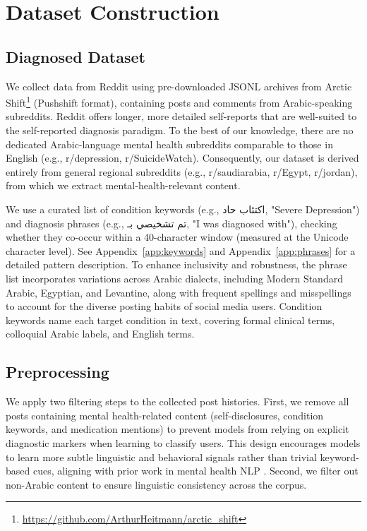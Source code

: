 \documentclass[11pt]{article}
\begin{document}
\section{Dataset Construction}
\label{subsec:data_source}

\subsection{Diagnosed Dataset}

We collect data from Reddit using pre-downloaded JSONL archives from Arctic Shift\footnote{\url{https://github.com/ArthurHeitmann/arctic_shift}} (Pushshift format), containing posts and comments from Arabic-speaking subreddits. Reddit offers longer, more detailed self-reports that are well-suited to the self-reported diagnosis paradigm. To the best of our knowledge, there are no dedicated Arabic-language mental health subreddits comparable to those in English (e.g., r/depression, r/SuicideWatch). Consequently, our dataset is derived entirely from general regional subreddits (e.g., r/saudiarabia, r/Egypt, r/jordan), from which we extract mental-health-relevant content.

We use a curated list of condition keywords (e.g., \foreignlanguage{arabic}{اكتئاب حاد}, "Severe Depression") and diagnosis phrases (e.g., \foreignlanguage{arabic}{تم تشخيصي بـ}, "I was diagnosed with"), checking whether they co-occur within a 40-character window (measured at the Unicode character level). See Appendix~\ref{app:keywords} and Appendix~\ref{app:phrases} for a detailed pattern description. To enhance inclusivity and robustness, the phrase list incorporates variations across Arabic dialects, including Modern Standard Arabic, Egyptian, and Levantine, along with frequent spellings and misspellings to account for the diverse posting habits of social media users. Condition keywords name each target condition in text, covering formal clinical terms, colloquial Arabic labels, and English terms.

\subsection{Preprocessing}

We apply two filtering steps to the collected post histories. First, we remove all posts containing mental health-related content (self-disclosures, condition keywords, and medication mentions) to prevent models from relying on explicit diagnostic markers when learning to classify users. This design encourages models to learn more subtle linguistic and behavioral signals rather than trivial keyword-based cues, aligning with prior work in mental health NLP \cite{cohan-etal-2018-smhd}. Second, we filter out non-Arabic content to ensure linguistic consistency across the corpus.
\end{document}
